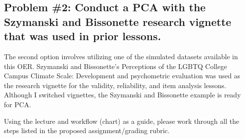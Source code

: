 \documentclass[
  english,
]{book}
\begin{document}
\hypertarget{problem-2-conduct-a-pca-with-the-szymanski-and-bissonette--szymanski_perceptions_2020-research-vignette-that-was-used-in-prior-lessons.}{%
\subsection{\texorpdfstring{Problem \#2: Conduct a PCA with the Szymanski and Bissonette \citeyearpar{szymanski_perceptions_2020} research vignette that was used in prior lessons.}{Problem \#2: Conduct a PCA with the Szymanski and Bissonette {[}-@szymanski\_perceptions\_2020{]} research vignette that was used in prior lessons.}}\label{problem-2-conduct-a-pca-with-the-szymanski-and-bissonette--szymanski_perceptions_2020-research-vignette-that-was-used-in-prior-lessons.}}

The second option involves utilizing one of the simulated datasets available in this OER. Szymanski and Bissonette's \citeyearpar{szymanski_perceptions_2020}Perceptions of the LGBTQ College Campus Climate Scale: Development and psychometric evaluation was used as the research vignette for the validity, reliability, and item analysis lessons. Although I switched vignettes, the Szymanski and Bissonette example is ready for PCA.

Using the lecture and workflow (chart) as a guide, please work through all the steps listed in the proposed assignment/grading rubric.
\end{document}
